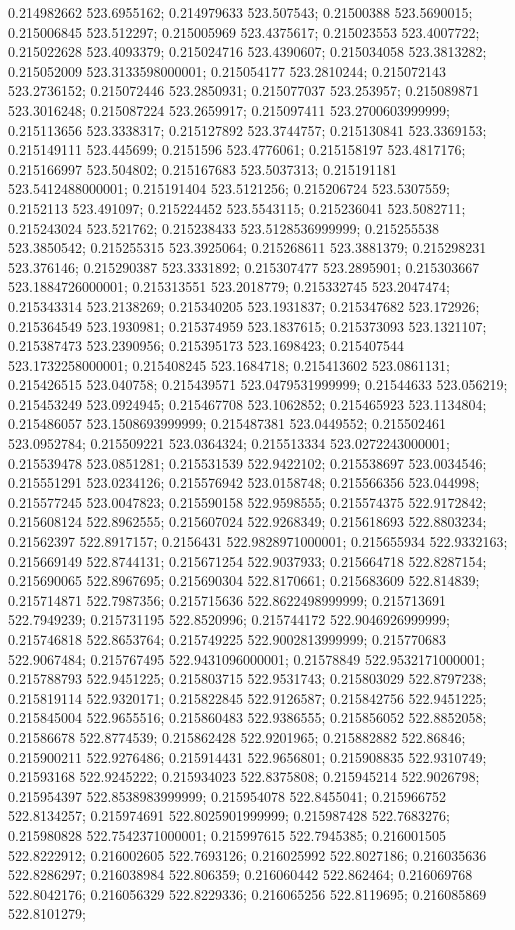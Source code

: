 0.214982662 523.6955162; 0.214979633 523.507543; 0.21500388 523.5690015; 0.215006845 523.512297; 0.215005969 523.4375617; 0.215023553 523.4007722; 0.215022628 523.4093379; 0.215024716 523.4390607; 0.215034058 523.3813282; 0.215052009 523.3133598000001; 0.215054177 523.2810244; 0.215072143 523.2736152; 0.215072446 523.2850931; 0.215077037 523.253957; 0.215089871 523.3016248; 0.215087224 523.2659917; 0.215097411 523.2700603999999; 0.215113656 523.3338317; 0.215127892 523.3744757; 0.215130841 523.3369153; 0.215149111 523.445699; 0.2151596 523.4776061; 0.215158197 523.4817176; 0.215166997 523.504802; 0.215167683 523.5037313; 0.215191181 523.5412488000001; 0.215191404 523.5121256; 0.215206724 523.5307559; 0.2152113 523.491097; 0.215224452 523.5543115; 0.215236041 523.5082711; 0.215243024 523.521762; 0.215238433 523.5128536999999; 0.215255538 523.3850542; 0.215255315 523.3925064; 0.215268611 523.3881379; 0.215298231 523.376146; 0.215290387 523.3331892; 0.215307477 523.2895901; 0.215303667 523.1884726000001; 0.215313551 523.2018779; 0.215332745 523.2047474; 0.215343314 523.2138269; 0.215340205 523.1931837; 0.215347682 523.172926; 0.215364549 523.1930981; 0.215374959 523.1837615; 0.215373093 523.1321107; 0.215387473 523.2390956; 0.215395173 523.1698423; 0.215407544 523.1732258000001; 0.215408245 523.1684718; 0.215413602 523.0861131; 0.215426515 523.040758; 0.215439571 523.0479531999999; 0.21544633 523.056219; 0.215453249 523.0924945; 0.215467708 523.1062852; 0.215465923 523.1134804; 0.215486057 523.1508693999999; 0.215487381 523.0449552; 0.215502461 523.0952784; 0.215509221 523.0364324; 0.215513334 523.0272243000001; 0.215539478 523.0851281; 0.215531539 522.9422102; 0.215538697 523.0034546; 0.215551291 523.0234126; 0.215576942 523.0158748; 0.215566356 523.044998; 0.215577245 523.0047823; 0.215590158 522.9598555; 0.215574375 522.9172842; 0.215608124 522.8962555; 0.215607024 522.9268349; 0.215618693 522.8803234; 0.21562397 522.8917157; 0.2156431 522.9828971000001; 0.215655934 522.9332163; 0.215669149 522.8744131; 0.215671254 522.9037933; 0.215664718 522.8287154; 0.215690065 522.8967695; 0.215690304 522.8170661; 0.215683609 522.814839; 0.215714871 522.7987356; 0.215715636 522.8622498999999; 0.215713691 522.7949239; 0.215731195 522.8520996; 0.215744172 522.9046926999999; 0.215746818 522.8653764; 0.215749225 522.9002813999999; 0.215770683 522.9067484; 0.215767495 522.9431096000001; 0.21578849 522.9532171000001; 0.215788793 522.9451225; 0.215803715 522.9531743; 0.215803029 522.8797238; 0.215819114 522.9320171; 0.215822845 522.9126587; 0.215842756 522.9451225; 0.215845004 522.9655516; 0.215860483 522.9386555; 0.215856052 522.8852058; 0.21586678 522.8774539; 0.215862428 522.9201965; 0.215882882 522.86846; 0.215900211 522.9276486; 0.215914431 522.9656801; 0.215908835 522.9310749; 0.21593168 522.9245222; 0.215934023 522.8375808; 0.215945214 522.9026798; 0.215954397 522.8538983999999; 0.215954078 522.8455041; 0.215966752 522.8134257; 0.215974691 522.8025901999999; 0.215987428 522.7683276; 0.215980828 522.7542371000001; 0.215997615 522.7945385; 0.216001505 522.8222912; 0.216002605 522.7693126; 0.216025992 522.8027186; 0.216035636 522.8286297; 0.216038984 522.806359; 0.216060442 522.862464; 0.216069768 522.8042176; 0.216056329 522.8229336; 0.216065256 522.8119695; 0.216085869 522.8101279; 